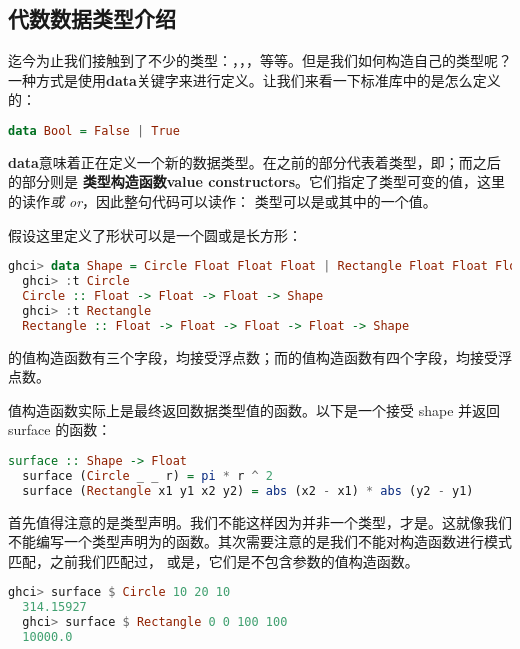 \documentclass[./main.tex]{subfiles}
\begin{document}
\subsection*{代数数据类型介绍}

迄今为止我们接触到了不少的类型：，，，等等。但是我们如何构造自己的类型呢？
一种方式是使用\textbf{data}关键字来进行定义。让我们来看一下标准库中的是怎么定义的：

\begin{lstlisting}[language=Haskell]
data Bool = False | True
\end{lstlisting}

\textbf{data}意味着正在定义一个新的数据类型。在\acode{=}之前的部分代表着类型，即；而之后的部分则是
\textbf{类型构造函数value constructors}。它们指定了类型可变的值，这里的\acode{|}读作\textit{或 or}，因此整句代码可以读作：
类型可以是或其中的一个值。

假设这里定义了形状可以是一个圆或是长方形：

\begin{lstlisting}[language=Haskell]
  ghci> data Shape = Circle Float Float Float | Rectangle Float Float Float Float
  ghci> :t Circle
  Circle :: Float -> Float -> Float -> Shape
  ghci> :t Rectangle
  Rectangle :: Float -> Float -> Float -> Float -> Shape
\end{lstlisting}

的值构造函数有三个字段，均接受浮点数；而的值构造函数有四个字段，均接受浮点数。

值构造函数实际上是最终返回数据类型值的函数。以下是一个接受 shape 并返回 surface 的函数：

\begin{lstlisting}[language=Haskell]
  surface :: Shape -> Float
  surface (Circle _ _ r) = pi * r ^ 2
  surface (Rectangle x1 y1 x2 y2) = abs (x2 - x1) * abs (y2 - y1)
\end{lstlisting}

首先值得注意的是类型声明。我们不能这样因为并非一个类型，才是。这就像我们
不能编写一个类型声明为的函数。其次需要注意的是我们不能对构造函数进行模式匹配，之前我们匹配过\acode{[]}，
或是，它们是不包含参数的值构造函数。

\begin{lstlisting}[language=Haskell]
  ghci> surface $ Circle 10 20 10
  314.15927
  ghci> surface $ Rectangle 0 0 100 100
  10000.0
\end{lstlisting}
\end{document}
